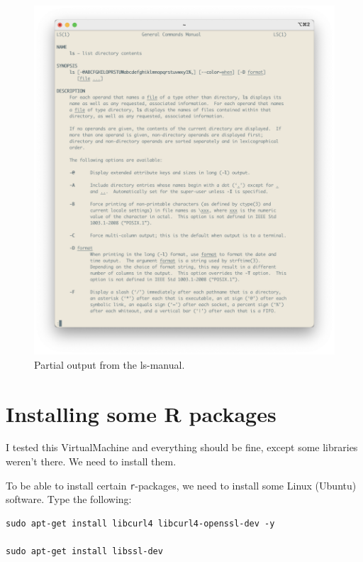 \documentclass[
]{book}
\begin{document}
\begin{figure}

{\centering \includegraphics[width=22.64in]{img/ls_manual} 

}

\caption{Partial output from the ls-manual.}\label{fig:ls-manual}
\end{figure}

\hypertarget{installing-some-r-packages}{%
\section{Installing some R packages}\label{installing-some-r-packages}}

I tested this VirtualMachine and everything should be fine, except some libraries weren't there. We need to install them.

To be able to install certain \texttt{r}-packages, we need to install some Linux (Ubuntu) software. Type the following:

\begin{verbatim}
sudo apt-get install libcurl4 libcurl4-openssl-dev -y

sudo apt-get install libssl-dev
\end{verbatim}
\end{document}
